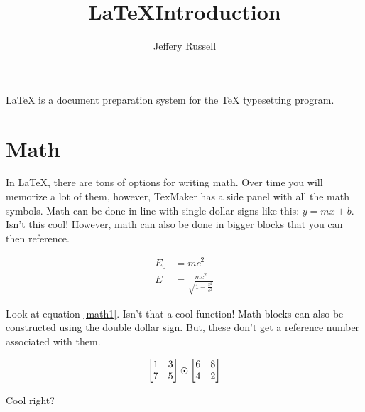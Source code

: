 \documentclass{article} %
\title{\LaTeX Introduction} %
\author{Jeffery Russell}
\begin{document}
  \maketitle %
  \LaTeX{} is a document preparation system for
  the \TeX{} typesetting program.

\section{Math}

	In \LaTeX, there are tons of options for writing math.
	Over time you will memorize a lot of them, however, TexMaker has a side panel with all the math symbols. Math can be done in-line with single dollar signs like this: $y = mx +b$. Isn't this cool! However, math can also be done in bigger blocks that you can then reference.

  \begin{align}
  	\label{math1}
    E_0 &= mc^2 \\
    E &= \frac{mc^2}{\sqrt{1-\frac{v^2}{c^2}}}
  \end{align} 
  
 Look at equation \ref{math1}. Isn't that a cool function! Math blocks can also be constructed using the double dollar sign. But, these don't get a reference number associated with them.
 
 
$$
\begin{bmatrix}
1 & 3\\
7 & 5
\end{bmatrix} \odot
\begin{bmatrix}
6 & 8\\
4 & 2
\end{bmatrix}\\*
$$



Cool right?
\end{document}
